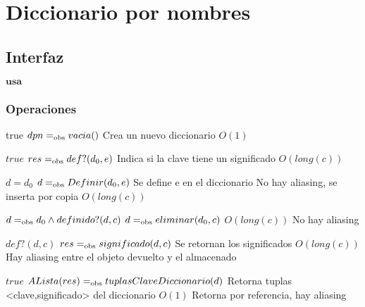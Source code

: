 
\section{Diccionario por nombres}

\subsection{Interfaz}

$\textbf{usa}$  


\subsubsection*{Operaciones}


 {true}
 {$dpn =_{\mathrm{obs}} vacia()$}
 {Crea un nuevo diccionario}
 {}
 {$O(1)$}
 
  {$true$}
  {$res =_{\mathrm{obs}} def?(d_0,e)$}
  {Indica si la clave tiene un significado}
  {}
  {$O(long(c))$}

  {$d=d_0$}
  {$d =_{\mathrm{obs}} Definir(d_0,e)$}
  {Se define e en el diccionario}
  {No hay aliasing, se inserta por copia}
  {$O(long(c))$}

 {$d =_{\mathrm{obs}} d_0 \land definido?(d,c)$}
 {$d =_{\mathrm{obs}} eliminar(d_0,c)$}
 {}
 {$O(long(c))$}
 {No hay aliasing}

 {$def?(d,c)$}
 {$res =_{\mathrm{obs}} significado(d,c)$}
 {Se retornan los significados}
 {$O(long(c))$}
 {Hay aliasing entre el objeto devuelto y el almacenado}

 {$true$}
 {$ALista(res) =_{\mathrm{obs}} tuplasClaveDiccionario(d)$}
 {Retorna tuplas <clave,significado> del diccionario}
 {$O(1)$}
 {Retorna por referencia, hay aliasing}


